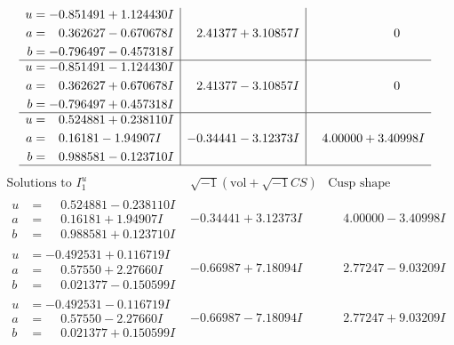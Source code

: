 \documentclass[1p]{elsarticle_modified}
\theoremstyle{definition}
\newcommand{\I}{\sqrt{-1}}
\begin{document}
$$\begin{array}{c|c|c}
\begin{aligned}
u &= -0.851491 + 1.124430 I \\
a &= \phantom{-}0.362627 - 0.670678 I \\
b &= -0.796497 - 0.457318 I\end{aligned}
 & \phantom{-}2.41377 + 3.10857 I & \phantom{-0.000000 } 0 \\ \hline\begin{aligned}
u &= -0.851491 - 1.124430 I \\
a &= \phantom{-}0.362627 + 0.670678 I \\
b &= -0.796497 + 0.457318 I\end{aligned}
 & \phantom{-}2.41377 - 3.10857 I & \phantom{-0.000000 } 0 \\ \hline\begin{aligned}
u &= \phantom{-}0.524881 + 0.238110 I \\
a &= \phantom{-}0.16181 - 1.94907 I \\
b &= \phantom{-}0.988581 - 0.123710 I\end{aligned}
 & -0.34441 - 3.12373 I & \phantom{-}4.00000 + 3.40998 I\\
 \hline 
 \end{array}$$\newpage$$\begin{array}{c|c|c}  
\text{Solutions to }I^u_{1}& \I (\text{vol} + \sqrt{-1}CS) & \text{Cusp shape}\\
 \hline 
\begin{aligned}
u &= \phantom{-}0.524881 - 0.238110 I \\
a &= \phantom{-}0.16181 + 1.94907 I \\
b &= \phantom{-}0.988581 + 0.123710 I\end{aligned}
 & -0.34441 + 3.12373 I & \phantom{-}4.00000 - 3.40998 I \\ \hline\begin{aligned}
u &= -0.492531 + 0.116719 I \\
a &= \phantom{-}0.57550 + 2.27660 I \\
b &= \phantom{-}0.021377 - 0.150599 I\end{aligned}
 & -0.66987 + 7.18094 I & \phantom{-}2.77247 - 9.03209 I \\ \hline\begin{aligned}
u &= -0.492531 - 0.116719 I \\
a &= \phantom{-}0.57550 - 2.27660 I \\
b &= \phantom{-}0.021377 + 0.150599 I\end{aligned}
 & -0.66987 - 7.18094 I & \phantom{-}2.77247 + 9.03209 I \\ \hline\begin{aligned}

\end{aligned}
\end{array}$$
\end{document}
